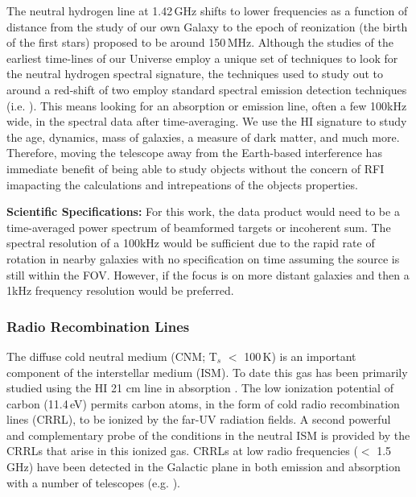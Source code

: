 The neutral hydrogen line at 1.42\,GHz shifts to lower frequencies as a function of distance from the study of our own Galaxy to the epoch of reonization (the birth of the first stars) proposed to be around 150\,MHz. Although the studies of the earliest time-lines of our Universe employ a unique set of techniques to look for the neutral hydrogen spectral signature, the techniques used to study out to around a red-shift of two employ standard spectral emission detection techniques (i.e. \citealt{WALLABY,FLASH}). This means looking for an absorption or emission line, often a few 100kHz wide, in the spectral data after time-averaging. We use the H{\sc I} signature to study the age, dynamics, mass of galaxies, a measure of dark matter, and much more. Therefore, moving the telescope away from the Earth-based interference has immediate benefit of being able to study objects without the concern of RFI imapacting the calculations and intrepeations of the objects properties.

\textbf{Scientific Specifications:} For this work, the data product would need to be a time-averaged power spectrum of beamformed targets or incoherent sum. The spectral resolution of a 100kHz would be sufficient due to the rapid rate of rotation in nearby galaxies with no specification on time assuming the source is still within the FOV. However, if the focus is on more distant galaxies and then a 1kHz frequency resolution would be preferred. 

\subsubsection{Radio Recombination Lines}
The diffuse cold neutral medium (CNM; T$_{s}$ $<$ 100\,K) is an important component of the interstellar medium (ISM). To date this gas has been primarily studied using the HI 21 cm line in absorption \citep{Dickey_1990}. The low ionization potential of carbon (11.4\,eV) permits carbon atoms, in the form of cold radio recombination lines (CRRL), to be ionized by the far-UV radiation fields. A second powerful and complementary probe of the conditions in the neutral ISM is provided by the CRRLs that arise in this ionized gas. CRRLs at low radio frequencies ($<$ 1.5 GHz) have been detected in the Galactic plane in both emission and absorption with a number of telescopes (e.g. \citealt{Kantharia_2001,Salas_2019,GDIGS}). 

